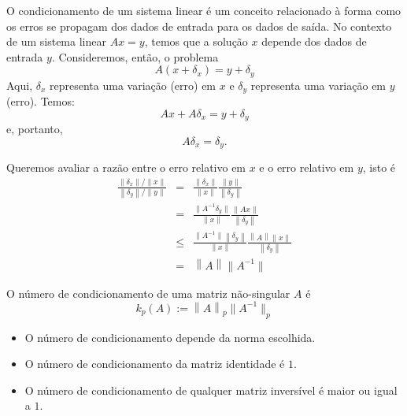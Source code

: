 O condicionamento de um sistema linear é um conceito relacionado à forma como os erros se propagam dos dados de entrada para os dados de saída. No contexto de um sistema linear $Ax=y$, temos que a solução $x$ depende dos dados de entrada $y$. Consideremos, então, o problema
\begin{equation*}
  A(x+\delta_x)=y+\delta_y
\end{equation*}
Aqui, $\delta_x$ representa uma variação (erro) em $x$ e $\delta_y$ representa uma variação em $y$ (erro). Temos:
\begin{equation*}
  Ax+A\delta_x=y+\delta_y
\end{equation*}
e, portanto,
\begin{equation*}
  A\delta_x=\delta_y.
\end{equation*}

Queremos avaliar a razão entre o erro relativo em $x$ e o erro relativo em $y$, isto é
\begin{eqnarray*}
\frac{\left\|\delta_x\right\|/\left\|x\right\|}{\left\|\delta_y\right\|/\|y\|} &=& \frac{\left\|\delta_x\right\|}{\left\|x\right\|}\frac{\|y\|}{\left\|\delta_y\right\|}\\
&=& \frac{\|A^{-1}\delta_y\|}{\left\|x\right\|}\frac{\|Ax\|}{\left\|\delta_y\right\|} \\
&\leq& \frac{\|A^{-1}\|\left\|\delta_y\right\|}{\left\|x\right\|}\frac{\left\|A\right\|\left\|x\right\|}{\left\|\delta_y\right\|}\\
&=& \left\|A\right\|\|A^{-1}\|
\end{eqnarray*}

\begin{defn} O número de condicionamento de uma matriz não-singular $A$ é
  \begin{equation*}
    k_p(A) := \left\|A\right\|_p \|A^{-1}\|_p
  \end{equation*}
\end{defn}

\begin{obs}
  \begin{itemize}
  \item O número de condicionamento depende da norma escolhida.
  \item O número de condicionamento da matriz identidade é $1$.
  \item O número de condicionamento de qualquer matriz inversível é maior ou igual a $1$.
  \end{itemize}
\end{obs}

